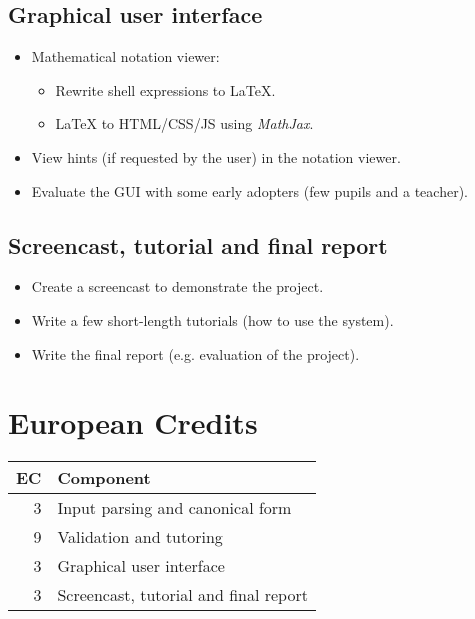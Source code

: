 \documentclass[10pt,a4paper]{article}
\begin{document}
\subsection{Graphical user interface}

\begin{itemize}
    \item Mathematical notation viewer:
    \begin{itemize}
        \item Rewrite shell expressions to \LaTeX.
        \item \LaTeX $ $ to HTML/CSS/JS using \emph{MathJax}.
    \end{itemize}
    \item View hints (if requested by the user) in the notation viewer.
    \item Evaluate the GUI with some early adopters (few pupils and a teacher).
\end{itemize}

\subsection{Screencast, tutorial and final report}

\begin{itemize}
    \item Create a screencast to demonstrate the project.
    \item Write a few short-length tutorials (how to use the system).
    \item Write the final report (e.g. evaluation of the project).
\end{itemize}

\section{European Credits}

\begin{tabular}{rl}
\toprule
EC & Component \\
\midrule
3  & Input parsing and canonical form \\
9  & Validation and tutoring \\
3  & Graphical user interface \\
3  & Screencast, tutorial and final report \\
\bottomrule
\end{tabular}
\end{document}
